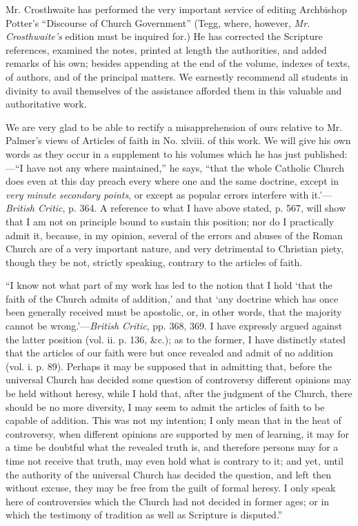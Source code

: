 Mr. Crosthwaite has performed the very important
service of editing Archbishop Potter's ``Discourse of Church Government''
(Tegg, where, however, \emph{Mr.
Crosthwaite's} edition
must be inquired for.) He has corrected the Scripture references,
examined the notes, printed at length the authorities, and added remarks
of his own; besides appending at the end of the volume, indexes of
texts, of authors, and of the principal matters. We earnestly recommend
all students in divinity to avail themselves of the assistance afforded
them in this valuable and authoritative work.

We are very glad to be able to rectify a
misapprehension of ours relative to Mr. Palmer's views of Articles of
faith in No. xlviii. of this work. We will give his own words as they
occur in a supplement to his volumes which he has just published:—``I
have not any where maintained,'' he says, ``that the whole Catholic Church
does even at this day preach every where one and the same doctrine, except in \emph{very minute secondary points}, or except as
popular errors interfere with it.'—\emph{British Critic}, p. 364. A
reference to what I have above stated, p. 567, will show that I am not
on principle bound to sustain this position; nor do I practically admit
it, because, in my opinion, several of the errors and abuses of the
Roman Church are of a very important nature, and very detrimental to
Christian piety, though they be not, strictly speaking, contrary to the
articles of faith.

``I know not what part of my work has led to the
notion that I hold ‘that the faith of the Church admits of addition,'
and that ‘any doctrine which has once been generally received must be
apostolic, or, in other words, that the majority cannot be wrong.'—\emph{British
Critic}, pp. 368, 369. I have expressly argued against the latter
position (vol. ii. p. 136, \&c.); as to the former, I have distinctly
stated that the articles of our faith were but once revealed and admit
of no addition (vol. i. p. 89). Perhaps it may be supposed that in
admitting that, before the universal Church has decided some question of
controversy different opinions may be held without heresy, while I hold
that, after the judgment of the Church, there should be no more
diversity, I may seem to admit the articles of faith to be capable of
addition. This was not my intention; I only mean that in the heat of
controversy, when different opinions are supported by men of learning,
it may for a time be doubtful what the revealed truth is, and therefore
persons may for a time not receive that truth, may even hold what is
contrary to it; and yet, until the authority of the universal Church has
decided the question, and left then without excuse, they may be free
from the guilt of formal heresy. I only speak here of controversies
which the Church had not decided in former ages; or in which the
testimony of tradition as well as Scripture is disputed.''


